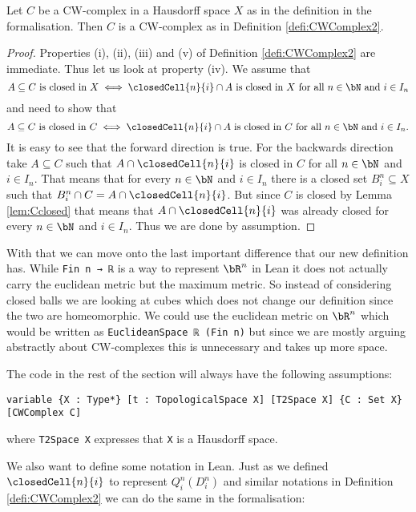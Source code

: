 \begin{lem}
  Let $C$ be a CW-complex in a Hausdorff space $X$ as in the definition in the formalisation.
  Then $C$ is a CW-complex as in Definition \ref{defi:CWComplex2}.
\end{lem}
\begin{proof}
  Properties (i), (ii), (iii) and (v) of Definition \ref{defi:CWComplex2} are immediate.
  Thus let us look at property (iv).
  We assume that
  \[A \subseteq C \text{ is closed in } X \iff \closedCell{n}{i} \cap A \text{ is closed in } X \text{ for all } n \in \bN \text{ and } i \in I_n\]
  and need to show that
  \[A \subseteq C \text{ is closed in } C \iff \closedCell{n}{i} \cap A \text{ is closed in } C \text{ for all } n \in \bN \text{ and } i \in I_n.\]
  It is easy to see that the forward direction is true.
  For the backwards direction take $A \subseteq C$ such that $A \cap \closedCell{n}{i}$ is closed in $C$ for all $n \in \bN$ and $i \in I_n$.
  That means that for every $n \in \bN$ and $i \in I_n$ there is a closed set $B_i^n \subseteq X$ such that $B^n_i \cap C = A \cap \closedCell{n}{i}$.
  But since $C$ is closed by Lemma \ref{lem:Cclosed} that means that $A \cap \closedCell{n}{i}$ was already closed for every $n \in \bN$ and $i \in I_n$.
  Thus we are done by assumption.
\end{proof}

With that we can move onto the last important difference that our new definition has.
While \lstinline{Fin n → ℝ} is a way to represent $\bR^n$ in Lean it does not actually carry the euclidean metric but the maximum metric.
So instead of considering closed balls we are looking at cubes which does not change our definition since the two are homeomorphic.
We could use the euclidean metric on $\bR^n$ which would be written as \lstinline{EuclideanSpace ℝ (Fin n)} but since we are mostly arguing abstractly about CW-complexes this is unnecessary and takes up more space.

The code in the rest of the section will always have the following assumptions:

\begin{lstlisting}
variable {X : Type*} [t : TopologicalSpace X] [T2Space X] {C : Set X} [CWComplex C]
\end{lstlisting}

where \lstinline{T2Space X} expresses that \lstinline{X} is a Hausdorff space.

We also want to define some notation in Lean.
Just as we defined $\closedCell{n}{i}$ to represent $Q^n_i(D_i^n)$ and similar notations in Definition \ref{defi:CWComplex2} we can do the same in the formalisation:

